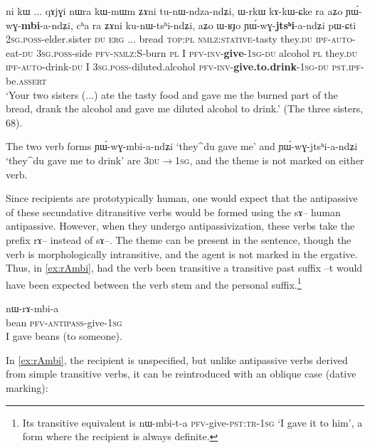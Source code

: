 \documentclass[oldfontcommands,oneside,a4paper,11pt]{article}
\newcommand{\ipa}[1]{{\phon \mbox{#1}}} %
\begin{document}
   \begin{exe}
\ex \label{ex:secundative}
\gll  \ipa{nɤ-pi}   	\ipa{ni}   	\ipa{kɯ}   	...   	\ipa{qɤjɣi}   	\ipa{nɯra}   	\ipa{kɯ-mɯm}   	\ipa{ʑɤni}   	\ipa{tu-nɯ-ndza-ndʑi,}   	\ipa{ɯ-rkɯ}   	\ipa{kɤ-kɯ-ɕke}   	\ipa{ra}   	\ipa{aʑo}   	\ipa{ɲɯ́-wɣ-\textbf{mbi}-a-ndʑi,}   	\ipa{cʰa}   	\ipa{ra}   	\ipa{ʑɤni}   	\ipa{ku-nɯ-tsʰi-ndʑi,}   	\ipa{aʑo}   	\ipa{ɯ-ʁɟo}   	\ipa{ɲɯ́-wɣ-\textbf{jtsʰi}-a-ndʑi}   	\ipa{pɯ-ɕti}        \\
\textsc{2sg.poss}-elder.sister \textsc{du} \textsc{erg} ... bread \textsc{top:pl} \textsc{nmlz:stative}-tasty they.\textsc{du} \textsc{ipf}-\textsc{auto}-eat-\textsc{du} \textsc{3sg.poss}-side \textsc{pfv}-\textsc{nmlz:S}-burn \textsc{pl}  I \textsc{pfv}-\textsc{inv}-\textbf{give}-\textsc{1sg}-\textsc{du} alcohol \textsc{pl} they.\textsc{du} \textsc{ipf}-\textsc{auto}-drink-\textsc{du} I \textsc{3sg.poss}-diluted.alcohol \textsc{pfv}-\textsc{inv}-\textbf{give.to.drink}-\textsc{1sg}-\textsc{du} \textsc{pst.ipf}-be.\textsc{assert}  \\
 \glt    `Your two sisters (...) ate the tasty food and gave me the burned part of the bread, drank the alcohol and gave me diluted alcohol to drink.'  (The three sisters, 68).
\end{exe} 

The two verb forms \ipa{ɲɯ́-wɣ-mbi-a-ndʑi} `they^{du} gave me' and 	\ipa{ɲɯ́-wɣ-jtsʰi-a-ndʑi}  `they^{du} gave me to drink' are \textsc{3du}$\rightarrow$\textsc{1sg}, and the theme is not marked on either verb. 
 
 Since recipients are prototypically human, one would expect that the antipassive of  these   secundative ditransitive verbs would be formed using the \ipa{sɤ}-- human antipassive. However, when they undergo antipassivization, these verbs take the prefix \ipa{rɤ}-- instead of \ipa{sɤ}--. The theme can be present in the sentence, though the verb is morphologically intransitive, and the agent is not marked in the ergative. Thus, in   \ref{ex:rAmbi}, had the verb been transitive a transitive past suffix --\ipa{t} would have been expected between the verb stem and the personal suffix.\footnote{Its transitive equivalent is \ipa{nɯ-mbi-t-a} \textsc{pfv}-give-\textsc{pst:tr}-\textsc{1sg} `I gave it to him', a form where the recipient is always definite.}

  \begin{exe} 
\ex \label{ex:rAmbi}
\gll \ipa{stoʁ} 	  	\ipa{nɯ-rɤ-mbi-a}   \\
     bean \textsc{pfv}-\textsc{antipass}-give-\textsc{1sg} \\
 \glt     I gave beans (to someone).
\end{exe} 
In \ref{ex:rAmbi}, the recipient is unspecified, but unlike antipassive verbs derived from simple transitive verbs, it can be reintroduced with an oblique case (dative marking):
 
\end{document}
